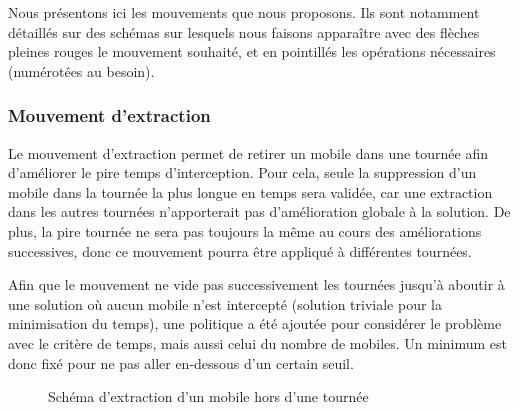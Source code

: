 		Nous présentons ici les mouvements que nous proposons. Ils sont notamment détaillés sur des schémas sur lesquels nous faisons apparaître avec des flèches pleines rouges le mouvement souhaité, et en pointillés les opérations nécessaires (numérotées au besoin).

		\subsubsection{Mouvement d'extraction}
			Le mouvement d'extraction permet de retirer un mobile dans une tournée afin d'améliorer le pire temps d'interception. Pour cela, seule la suppression d'un mobile dans la tournée la plus longue en temps sera validée, car une extraction dans les autres tournées n'apporterait pas d'amélioration globale à la solution. De plus, la pire tournée ne sera pas toujours la même au cours des améliorations successives, donc ce mouvement pourra être appliqué à différentes tournées. 

			Afin que le mouvement ne vide pas successivement les tournées jusqu'à aboutir à une solution où aucun mobile n'est intercepté (solution triviale pour la minimisation du temps), une politique a été ajoutée pour considérer le problème avec le critère de temps, mais aussi celui du nombre de mobiles. Un minimum est donc fixé pour ne pas aller en-dessous d'un certain seuil.
			
			\newpage
			\begin{code}
				\begin{algo}[informal]
					\BEGIN
							\ENDIF
						\ENDFORGEN
					\END
				\end{algo}
			\end{code}
			
			\label{subs:move_extract}
			\begin{figure}[h!]
			\centering
			\begin{tikzpicture}[schema]
				
			\end{tikzpicture}
			\caption{Schéma d'extraction d'un mobile hors d'une tournée}
			\label{fig:move_extract}
			\end{figure}

